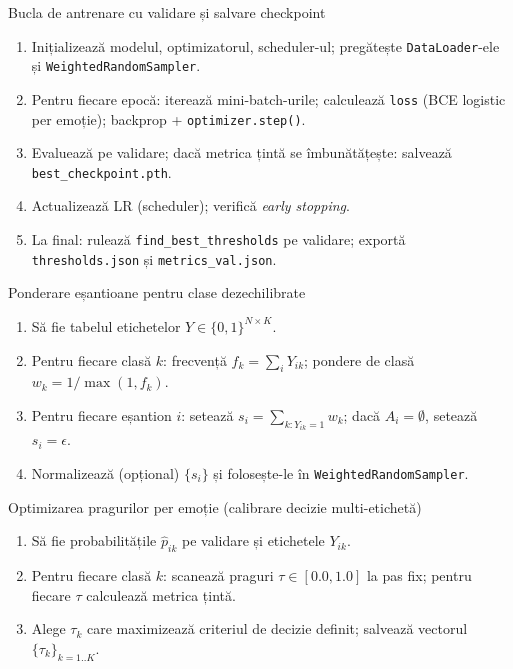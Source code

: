 \begin{algorithm}[H]
\caption{Bucla de antrenare cu validare și salvare checkpoint}
\label{alg:c5-train-loop}
\begin{enumerate}
  \item Inițializează modelul, optimizatorul, scheduler-ul; pregătește \texttt{DataLoader}-ele și \texttt{WeightedRandomSampler}.
  \item Pentru fiecare epocă: iterează mini-batch-urile; calculează \texttt{loss} (BCE logistic per emoție); backprop + \texttt{optimizer.step()}.
  \item Evaluează pe validare; dacă metrica țintă se îmbunătățește: salvează \texttt{best\_checkpoint.pth}.
  \item Actualizează LR (scheduler); verifică \emph{early stopping}.
  \item La final: rulează \texttt{find\_best\_thresholds} pe validare; exportă \texttt{thresholds.json} și \texttt{metrics\_val.json}.
\end{enumerate}
\end{algorithm}

\begin{algorithm}[H]
\caption{Ponderare eșantioane pentru clase dezechilibrate}
\label{alg:c5-weighted-sampler}
\begin{enumerate}
  \item Să fie tabelul etichetelor $Y \in \{0,1\}^{N \times K}$.
  \item Pentru fiecare clasă $k$: frecvență $f_k = \sum_{i} Y_{ik}$; pondere de clasă $w_k = 1/\max(1,f_k)$.
  \item Pentru fiecare eșantion $i$: setează $s_i = \sum_{k: Y_{ik}=1} w_k$; dacă $A_i=\emptyset$, setează $s_i=\epsilon$.
  \item Normalizează (opțional) $\{s_i\}$ și folosește-le în \texttt{WeightedRandomSampler}.
\end{enumerate}
\end{algorithm}

\begin{algorithm}[H]
\caption{Optimizarea pragurilor per emoție (calibrare decizie multi-etichetă)}
\label{alg:c5-threshold-optimization}
\begin{enumerate}
  \item Să fie probabilitățile $\hat{p}_{ik}$ pe validare și etichetele $Y_{ik}$.
  \item Pentru fiecare clasă $k$: scanează praguri $\tau \in [0.0,1.0]$ la pas fix; pentru fiecare $\tau$ calculează metrica țintă.
  \item Alege $\tau_k$ care maximizează criteriul de decizie definit; salvează vectorul $\{\tau_k\}_{k=1..K}$.
\end{enumerate}
\end{algorithm}

